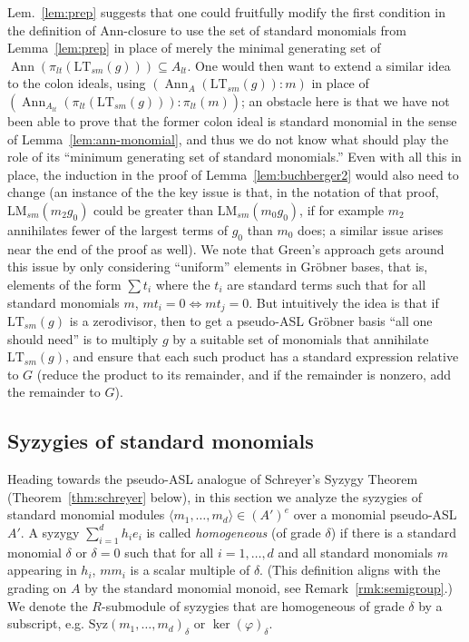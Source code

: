 \documentclass[11pt,reqno]{amsart}
\DeclareMathOperator{\Ann}{Ann}
\newcommand{\lmsm}{\text{LM}_{sm}}
\newcommand{\ltsm}{\text{LT}_{sm}}
\newcommand{\Syz}{\text{Syz}}
\theoremstyle{definition}
\numberwithin{equation}{section}
\begin{document}
\begin{remark}
Lem.~\ref{lem:prep} suggests that one could fruitfully modify the first condition in the definition of Ann-closure to use the set of standard monomials from Lemma~\ref{lem:prep} in place of merely the minimal generating set of $\Ann(\pi_{lt}(\ltsm(g))) \subseteq A_{lt}$. One would then want to extend a similar idea to the colon ideals, using $(\Ann_A(\ltsm(g)) : m)$ in place of $(\Ann_{A_{lt}}(\pi_{lt}(\ltsm(g))) : \pi_{lt}(m))$; an obstacle here is that we have not been able to prove that the former colon ideal is standard monomial in the sense of Lemma~\ref{lem:ann-monomial}, and thus we do not know what should play the role of its ``minimum generating set of standard monomials.'' Even with all this in place, the induction in the proof of Lemma~\ref{lem:buchberger2} would also need to change (an instance of the the key issue is that, in the notation of that proof, $\lmsm(m_2 g_0)$ could be greater than $\lmsm(m_0 g_0)$, if for example $m_2$ annihilates fewer of the largest terms of $g_0$ than $m_0$ does; a similar issue arises near the end of the proof as well). We note that Green's approach \cite{green} gets around this issue by only considering ``uniform'' elements in Gröbner bases, that is, elements of the form $\sum t_i$ where the $t_i$ are standard terms such that for all standard monomials $m$, $mt_i = 0 \Leftrightarrow mt_j = 0$. But intuitively the idea is that if $\ltsm(g)$ is a zerodivisor, then to get a pseudo-ASL Gröbner basis ``all one should need'' is to multiply $g$ by a suitable set of monomials that annihilate $\ltsm(g)$, and ensure that each such product has a standard expression relative to $G$ (reduce the product to its remainder, and if the remainder is nonzero, add the remainder to $G$).
\end{remark}

\subsection{Syzygies of standard monomials}
Heading towards the pseudo-ASL analogue of Schreyer's Syzygy Theorem (Theorem~\ref{thm:schreyer} below), in this section we analyze the syzygies of standard monomial modules $\langle m_1,\dotsc,m_d \rangle \in (A')^e$ over a monomial pseudo-ASL $A'$. A syzygy $\sum_{i=1}^d h_i e_i$ is called \emph{homogeneous} (of grade $\delta$) if there is a standard monomial $\delta$ or $\delta=0$ such that for all $i=1,\dotsc,d$ and all standard monomials $m$ appearing in $h_i$, $mm_i$ is a scalar multiple of $\delta$. (This definition aligns with the grading on $A$ by the standard monomial monoid, see Remark~\ref{rmk:semigroup}.) We denote the $R$-submodule of syzygies that are homogeneous of grade $\delta$ by a subscript, e.g. $\Syz(m_1, \dotsc, m_d)_{\delta}$ or $\ker(\varphi)_{\delta}$.
\end{document}
